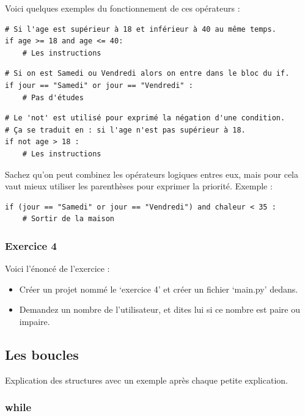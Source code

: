 \documentclass[12pt]{article}
\begin{document}
            Voici quelques exemples du fonctionnement de ces opérateurs :
            \begin{lstlisting}[style=code]
# Si l'age est supérieur à 18 et inférieur à 40 au même temps.
if age >= 18 and age <= 40:
    # Les instructions
            \end{lstlisting}

            \begin{lstlisting}[style=code, breaklines=false]
# Si on est Samedi ou Vendredi alors on entre dans le bloc du if.
if jour == "Samedi" or jour == "Vendredi" :
    # Pas d'études
            \end{lstlisting}

            \begin{lstlisting}[style=code]
# Le 'not' est utilisé pour exprimé la négation d'une condition.
# Ça se traduit en : si l'age n'est pas supérieur à 18.
if not age > 18 :
    # Les instructions 
            \end{lstlisting}

            Sachez qu'on peut combinez les opérateurs logiques entres eux, mais pour cela vaut mieux 
            utiliser les parenthèses pour exprimer la priorité. Exemple :
            \begin{lstlisting}[style=code]
if (jour == "Samedi" or jour == "Vendredi") and chaleur < 35 :
    # Sortir de la maison
            \end{lstlisting}
        
        \subsubsection{Exercice 4}
            Voici l'énoncé de l'exercice :
            \begin{itemize}
                \item Créer un projet nommé le `exercice 4' et créer un fichier `main.py' dedans.
                \item Demandez un nombre de l'utilisateur, et dites lui si ce nombre est paire ou impaire.
            \end{itemize}

\clearpage

    \subsection{Les boucles}
        Explication des structures avec un exemple après chaque petite explication.
        \subsubsection{while}
\end{document}
